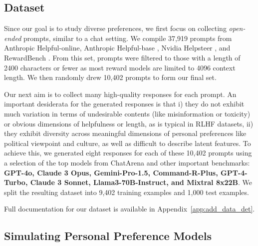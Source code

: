 \subsection{Dataset}

Since our goal is to study diverse preferences, we first focus on collecting \textit{open-ended} prompts, similar to a chat setting.
We compile 37,919 prompts from Anthropic Helpful-online, Anthropic Helpful-base \citep{bai2022training}, Nvidia Helpsteer \citep{wang2023helpsteermultiattributehelpfulnessdataset}, and RewardBench \citep{lambert2024rewardbench}.
From this set, prompts were filtered to those with a length of 2400 characters or fewer as most reward models are limited to 4096 context length. We then randomly drew 10,402 prompts to form our final set.

Our next aim is to collect many high-quality responses for each prompt. 
An important desiderata for the generated responses is that i) they do not exhibit much variation in terms of undesirable contents (like misinformation or toxicity) or obvious dimensions of helpfulness or length, as is typical in RLHF datasets, ii) they exhibit diversity across meaningful dimensions of personal preferences like political viewpoint and culture, as well as difficult to describe latent features.
To achieve this, we generated eight responses for each of these 10,402 prompts using a selection of the top models from ChatArena and other important benchmarks: \textbf{ GPT-4o, Claude 3 Opus, Gemini-Pro-1.5, Command-R-Plus, GPT-4-Turbo, Claude 3 Sonnet, Llama3-70B-Instruct, and Mixtral 8x22B}. We split the resulting dataset into 9,402 training examples and 1,000 test examples. 

Full documentation for our dataset is available in Appendix~\ref{app:add_data_det}.

\subsection{Simulating Personal Preference Models}\label{sec:sim_users}

